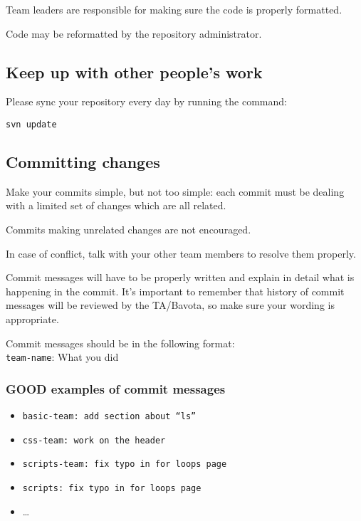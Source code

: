 \documentclass[hidelinks,12pt,a4paper,numbers=enddot]{scrartcl}
\begin{document}
Team leaders are responsible for making sure the code is properly
formatted.

Code may be reformatted by the repository administrator.

\subsection{Keep up with other people's work}\label{keep-up-with-other-peoples-work}

Please sync your repository every day by running the command:

\begin{verbatim}
svn update
\end{verbatim}

\subsection{Committing changes}\label{committing-changes}

Make your commits simple, but not too simple: each commit must be
dealing with a limited set of changes which are all related.

Commits making unrelated changes are not encouraged.

In case of conflict, talk with your other team members to resolve them
properly.

Commit messages will have to be properly written and explain in detail
what is happening in the commit. It's important to remember that history of commit messages will be reviewed by the TA/Bavota, so make sure your wording is appropriate.

Commit messages should be in the following format:\\

\texttt{team-name}: What you did

\subsubsection{GOOD examples of commit messages}

\begin{itemize}
\item \texttt{basic-team: add section about ``ls''}
\item \texttt{css-team: work on the header}
\item \texttt{scripts-team: fix typo in for loops page}
\item \texttt{scripts: fix typo in for loops page}
\item \ldots
\end{itemize}
\end{document}
